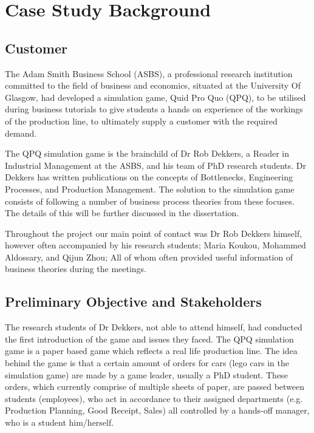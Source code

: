 \documentclass{l3proj}
\begin{document}
\section{Case Study Background}
\label{sec:casestudy}

\subsection{Customer}

The Adam Smith Business School (ASBS), a professional research institution committed to the field of business and economics, situated at the University Of Glasgow, had developed a simulation game, Quid Pro Quo (QPQ), to be utilised during business tutorials to give students a hands on experience of the workings of the production line, to ultimately supply a customer with the required demand.

The QPQ simulation game is the brainchild of Dr Rob Dekkers, a Reader in Industrial Management at the ASBS, and his team of PhD research students. Dr Dekkers has written publications on the concepts of Bottlenecks, Engineering Processes, and Production Management. The solution to the simulation game consists of following a number of business process theories from these focuses. The details of this will be further discussed in the dissertation. 

Throughout the project our main point of contact was Dr Rob Dekkers himself, however often accompanied by his research students; Maria Koukou, Mohammed Aldossary, and Qijun Zhou; All of whom often provided useful information of business theories during the meetings.


\subsection{Preliminary Objective and Stakeholders}
The research students of Dr Dekkers, not able to attend himself, had conducted the first introduction of the game and issues they faced. The QPQ simulation game is a paper based game which reflects a real life production line. The idea behind the game is that a certain amount of orders for cars (lego cars in the simulation game) are made by a game leader, usually a PhD student. These orders, which currently comprise of multiple sheets of paper, are passed between students (employees), who act in accordance to their assigned departments (e.g. Production Planning, Good Receipt, Sales) all controlled by a hands-off manager, who is a student him/herself. 
\end{document}
